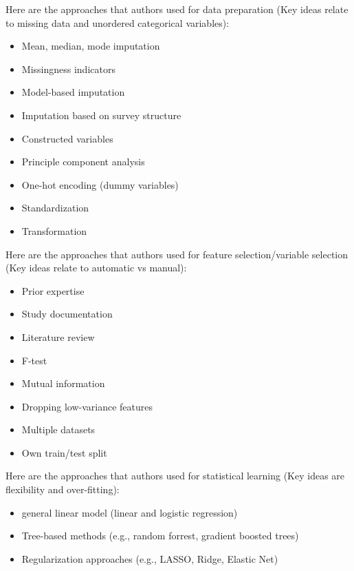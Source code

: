 \documentclass{beamer}
\begin{document}
\begin{frame}

Here are the approaches that authors used for data preparation (Key ideas relate to missing data and unordered categorical variables):

\begin{itemize}
\item Mean, median, mode imputation 
\item Missingness indicators
\item Model-based imputation
\item Imputation based on survey structure
\item Constructed variables 
\item Principle component analysis
\item One-hot encoding (dummy variables) 
\item Standardization
\item Transformation
\end{itemize}

\end{frame}
\begin{frame}

Here are the approaches that authors used for feature selection/variable selection (Key ideas relate to automatic vs manual):

\begin{itemize}
\item Prior expertise
\item Study documentation
\item Literature review
\item F-test
\item Mutual information
\item Dropping low-variance features
\item Multiple datasets
\item Own train/test split
\end{itemize}

\end{frame}
\begin{frame}
Here are the approaches that authors used for statistical learning (Key ideas are flexibility and over-fitting):

\begin{itemize}
\item general linear model (linear and logistic regression)
\item Tree-based methods (e.g., random forrest, gradient boosted trees)
\item Regularization approaches (e.g., LASSO, Ridge, Elastic Net)
\end{itemize}

\end{frame}
\end{document}
